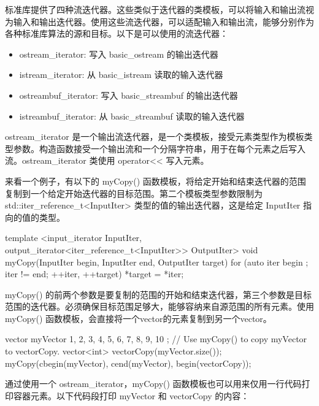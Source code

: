 
标准库提供了四种流迭代器。这些类似于迭代器的类模板，可以将输入和输出流视为输入和输出迭代器。使用这些流迭代器，可以适配输入和输出流，能够分别作为各种标准库算法的源和目标。以下是可以使用的流迭代器：

\begin{itemize}
\item
ostream\_iterator: 写入 basic\_ostream 的输出迭代器

\item
istream\_iterator: 从 basic\_istream 读取的输入迭代器

\item
ostreambuf\_iterator: 写入 basic\_streambuf 的输出迭代器

\item
istreambuf\_iterator:  从 basic\_streambuf 读取的输入迭代器
\end{itemize}


ostream\_iterator 是一个输出流迭代器，是一个类模板，接受元素类型作为模板类型参数。构造函数接受一个输出流和一个分隔字符串，用于在每个元素之后写入流。ostream\_iterator 类使用 operator<{}< 写入元素。

来看一个例子，有以下的 myCopy() 函数模板，将给定开始和结束迭代器的范围复制到一个给定开始迭代器的目标范围。第二个模板类型参数限制为 std::iter\_reference\_t<InputIter> 类型的值的输出迭代器，这是给定 InputIter 指向的值的类型。

\begin{cpp}
template <input_iterator InputIter,
    output_iterator<iter_reference_t<InputIter>> OutputIter>
void myCopy(InputIter begin, InputIter end, OutputIter target)
{
    for (auto iter { begin }; iter != end; ++iter, ++target) { *target = *iter; }
}
\end{cpp}

myCopy() 的前两个参数是要复制的范围的开始和结束迭代器，第三个参数是目标范围的迭代器。必须确保目标范围足够大，能够容纳来自源范围的所有元素。使用 myCopy() 函数模板，会直接将一个vector的元素复制到另一个vector。

\begin{cpp}
vector myVector { 1, 2, 3, 4, 5, 6, 7, 8, 9, 10 };
// Use myCopy() to copy myVector to vectorCopy.
vector<int> vectorCopy(myVector.size());
myCopy(cbegin(myVector), cend(myVector), begin(vectorCopy));
\end{cpp}

通过使用一个 ostream\_iterator，myCopy() 函数模板也可以用来仅用一行代码打印容器元素。以下代码段打印 myVector 和 vectorCopy 的内容：

